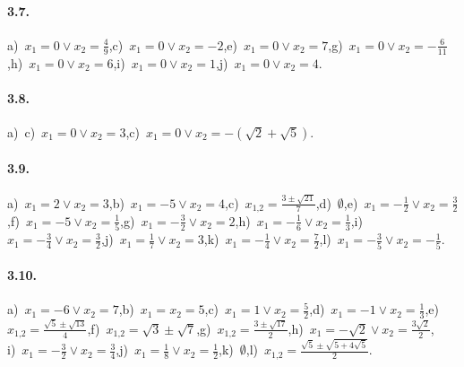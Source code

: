 \paragraph{3.7.} a)~$x_{1} = 0 \vee x_{2} = \frac{4}{9}$,\quad c)~$x_{1} = 0 \vee x_{2} = - 2$,\quad e)~$x_{1} = 0 \vee x_{2} = 7$,\quad g)~$x_{1} = 0 \vee x_{2} = - \frac{6}{11}$,\quad h)~$x_{1} = 0 \vee x_{2} = 6$,\quad i)~$x_{1} = 0 \vee x_{2} = 1$,\quad j)~$x_{1} = 0 \vee x_{2} = 4$.


\paragraph{3.8.} a)~c)~$x_{1} = 0 \vee x_{2} = 3$,\quad c)~$x_{1} = 0 \vee x_{2} = - (\sqrt{2} + \sqrt{5})$.

\paragraph{3.9.} a)~$x_{1}=2\vee x_{2}=3$,\quad b)~$x_{1}=-5\vee x_{2}=4$,\quad c)~$x_{1\text{,}2}=\frac{3 \pm \sqrt{21}}{7}$,\quad d)~$\emptyset$,\quad e)~$x_{1}=-\frac{1}{2}\vee x_{2}=\frac{3}{2}$,\quad f)~$x_{1}=-5\vee x_{2}=\frac{1}{5}$,\quad g)~$x_{1}=-\frac{3}{2}\vee x_{2}=2$,\quad h)~$x_{1}=-\frac{1}{6}\vee x_{2}=\frac{1}{3}$,\quad i)~$x_{1}=-\frac{3}{4}\vee x_{2}=\frac{3}{2}$,\quad j)~$x_{1}=\frac{1}{7}\vee x_{2}=3$,\quad k)~$x_{1}=-\frac{1}{4}\vee x_{2}=\frac{7}{2}$,\quad l)~$x_{1}=-\frac{3}{5}\vee x_{2}=-\frac{1}{5}$.

\paragraph{3.10.} a)~$x_{1} =-6 \vee x_{2} = 7$,\quad b)~$x_{1} = x_{2} = 5$,\quad c)~$x_{1} = 1 \vee x_{2} = \frac{5}{2}$,\quad d)~$x_{1} =-1 \vee x_{2} = \frac{1}{3}$,\quad e)~$x_{1\text{,}2} = \frac{\sqrt{5} \pm \sqrt{13}}{4}$,\quad f)~$x_{1\text{,}2} = \sqrt{3} \pm \sqrt{7}$,\quad g)~$x_{1\text{,}2} = \frac{3 \pm \sqrt{17}}{2}$,\quad h)~$x_{1} =-\sqrt{2} \vee x_{2} = \frac{3 \sqrt{2}}{2}$,\protect\\
i)~$x_{1} =-\frac{3}{2} \vee x_{2} = \frac{3}{4}$,\quad j)~$x_{1} = \frac{1}{8} \vee x_{2} = \frac{1}{2}$,\quad k)~$\emptyset$,\quad l)~$x_{1\text{,}2} = \frac{\sqrt{5} \pm \sqrt{5 + 4 \sqrt{5}}}{2}$.

